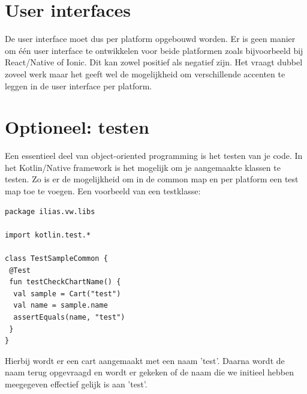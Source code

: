 \section{User interfaces}
De user interface moet dus per platform opgebouwd worden. Er is geen manier om één user interface te ontwikkelen voor beide platformen zoals bijvoorbeeld bij React/Native of Ionic. Dit kan zowel positief als negatief zijn. Het vraagt dubbel zoveel werk maar het geeft wel de mogelijkheid om verschillende accenten te leggen in de user interface per platform.

\section{Optioneel: testen}
Een essentieel deel van object-oriented programming is het testen van je code. In het Kotlin/Native framework is het mogelijk om je aangemaakte klassen te testen. Zo is er de mogelijkheid om in de common map en per platform een test map toe te voegen. Een voorbeeld van een testklasse:

\begin{lstlisting}
package ilias.vw.libs

import kotlin.test.*

class TestSampleCommon {
 @Test
 fun testCheckChartName() {
  val sample = Cart("test")
  val name = sample.name
  assertEquals(name, "test")
 }
}

\end{lstlisting}

Hierbij wordt er een cart aangemaakt met een naam 'test'. Daarna wordt de naam terug opgevraagd en wordt er gekeken of de naam die we initieel hebben meegegeven effectief gelijk is aan 'test'.